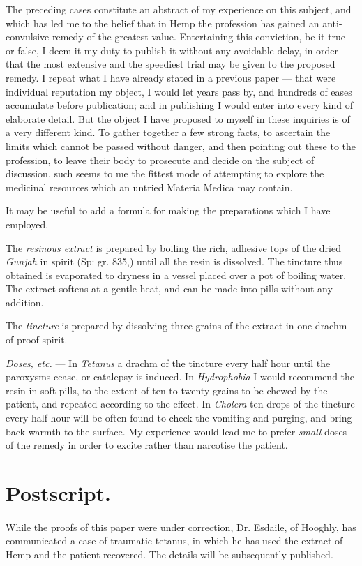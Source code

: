 \documentclass[a4paper, 11pt, oneside, polutonikogreek, english]{article}
\begin{document}
The preceding cases constitute an abstract of my experience on this subject, and which has led me to the belief that in Hemp the profession has gained an anti-convulsive remedy of the greatest value. Entertaining this conviction, be it true or false, I deem it my duty to publish it without any avoidable delay, in order that the most extensive and the speediest trial may be given to the proposed remedy. I repeat what I have already stated in a previous paper --- that were individual reputation my object, I would let years pass by, and hundreds of eases accumulate before publication; and in publishing I would enter into every kind of elaborate detail. But the object I have proposed to myself in these inquiries is of a very different kind. To gather together a few strong facts, to ascertain the limits which cannot be passed without danger, and then pointing out these to the profession, to leave their body to prosecute and decide on the subject of discussion, such seems to me the fittest mode of attempting to explore the medicinal resources which an untried Materia Medica may contain.

It may be useful to add a formula for making the preparations which I have employed.

The \emph{resinous extract} is prepared by boiling the rich, adhesive tops of the dried \emph{Gunjah} in spirit (Sp: gr. 835,) until all the resin is dissolved. The tincture thus obtained is evaporated to dryness in a vessel placed over a pot of boiling water. The extract softens at a gentle heat, and can be made into pills without any addition.

The \emph{tincture} is prepared by dissolving three grains of the extract in one drachm of proof spirit.

\emph{Doses, etc.} --- In \emph{Tetanus} a drachm of the tincture every half hour until the paroxysms cease, or catalepsy is induced. In \emph{Hydrophobia} I would recommend the resin in soft pills, to the extent of ten to twenty grains to be chewed by the patient, and repeated according to the effect. In \emph{Cholera} ten drops of the tincture every half hour will be often found to check the vomiting and purging, and bring back warmth to the surface. My experience would lead me to prefer \emph{small} doses of the remedy in order to excite rather than narcotise the patient.
\clearpage
\section{Postscript.}
\paragraph{}
While the proofs of this paper were under correction, Dr. Esdaile, of Hooghly, has communicated a case of traumatic tetanus, in which he has used the extract of Hemp and the patient recovered. The details will be subsequently published.
\end{document}
